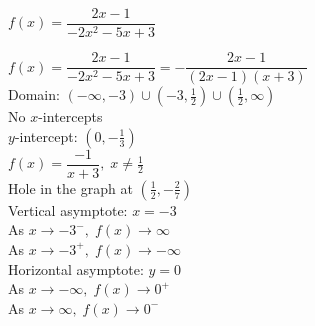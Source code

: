 {$f(x) = \dfrac{2x - 1}{-2x^{2} - 5x + 3}$}
{$f(x) = \dfrac{2x - 1}{-2x^{2} - 5x + 3} = -\dfrac{2x - 1}{(2x - 1)(x + 3)}$\\
Domain: $(-\infty, -3) \cup (-3, \frac{1}{2}) \cup (\frac{1}{2}, \infty)$\\
No $x$-intercepts\\
$y$-intercept: $(0, -\frac{1}{3})$\\
$f(x) = \dfrac{-1}{x + 3}, \; x \neq \frac{1}{2}$\\
Hole in the graph at $(\frac{1}{2}, -\frac{2}{7})$\\
Vertical asymptote: $x = -3$\\
As $x \rightarrow -3^{-}, \; f(x) \rightarrow \infty$\\
As $x \rightarrow -3^{+}, \; f(x) \rightarrow -\infty$\\
Horizontal asymptote: $y = 0$\\
As $x \rightarrow -\infty, \; f(x) \rightarrow 0^{+}$\\
As $x \rightarrow \infty, \; f(x) \rightarrow 0^{-}$


\begin{center}
\end{center}}